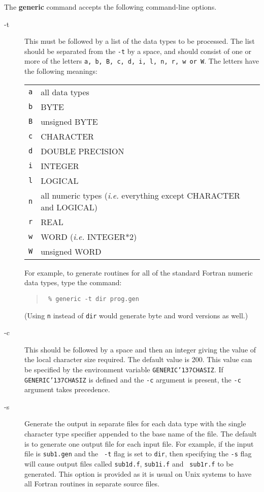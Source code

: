 \documentclass[twoside,11pt]{article}
\renewcommand{\_}{{\tt\char'137}}     %
\begin{document}
The {\bf generic} command accepts the following command-line options.

\begin{description}

\item[-t] This must be followed by a list of the data types to be
processed. The list should be separated from the {\tt -t} by a space,
and should consist of one or more of the letters {\tt a, b, B, c, d, i, l,
n, r, w or W}.  The letters have the following meanings:
\begin{center}
\begin{tabular}{ll}
{\tt a} & all data types \\
{\tt b} & BYTE \\
{\tt B} & unsigned BYTE \\
{\tt c} & CHARACTER \\
{\tt d} & DOUBLE PRECISION \\
{\tt i} & INTEGER \\
{\tt l} & LOGICAL \\
{\tt n} & all numeric types (\emph{i.e.} everything except CHARACTER and LOGICAL)\\
{\tt r} & REAL \\
{\tt w} & WORD (\emph{i.e.} INTEGER*2) \\
{\tt W} & unsigned WORD \\
\end{tabular}
\end{center}

For example, to generate routines for all of the standard Fortran numeric data
types, type the command:

\begin{quote}{\tt
\% generic -t dir prog.gen
}
\end{quote}

(Using {\tt n} instead of {\tt dir} would generate byte and word versions as
well.)

\item[-c] This should be followed by a space and then an integer
giving the value of the local character size required.  The default
value is 200. This value can be specified by the environment variable
{\tt GENERIC\_CHASIZ}.  If {\tt GENERIC\_CHASIZ} is defined and the
{\tt -c} argument is present, the {\tt -c} argument takes precedence.

\item[-s] Generate the output in separate files for each data type
with the single character type specifier appended to the base name of
the file.  The default is to generate one output file for each input
file.  For example, if the input file is {\tt sub1.gen} and the {\tt
-t} flag is set to {\tt dir}, then specifying the {\tt -s} flag will
cause output files called {\tt sub1d.f}, {\tt sub1i.f} and {\tt
sub1r.f} to be generated.  This option is provided as it is usual on
Unix systems to have all Fortran routines in separate source files.


\end{description}
\end{document}
